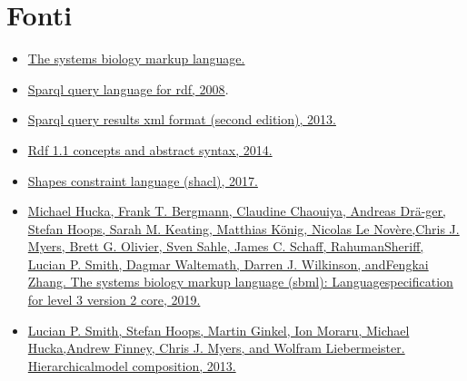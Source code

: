 \documentclass{article}
\begin{document}
\section{Fonti}
\begin{itemize}
    \item \href{http://sbml.org/Main_Page}{The systems biology markup language.}
    \item \href{https://www.w3.org/TR/rdf-sparql-query/}{Sparql query language for rdf, 2008}.  
    \item \href{https://www.w3.org/TR/rdf-sparql-XMLres/#defn-srd}{Sparql query results xml format (second edition), 2013.}
    \item \href{https://www.w3.org/TR/rdf11-concepts/#dfn-datatype}{Rdf 1.1 concepts and abstract syntax, 2014.}
    \item \href{https://www.w3.org/TR/shacl/}{Shapes constraint language (shacl), 2017.}
    \item \href{http://co.mbine.org/specifications/sbml.level-3.version-2.core.release-2.pdf}{Michael Hucka, Frank T. Bergmann, Claudine Chaouiya, Andreas Drä-ger, Stefan Hoops, Sarah M. Keating, Matthias König, Nicolas Le Novère,Chris J. Myers, Brett G. Olivier, Sven Sahle, James C. Schaff, RahumanSheriff, Lucian P. Smith, Dagmar Waltemath, Darren J. Wilkinson, andFengkai Zhang. The systems biology markup language (sbml): Languagespecification for level 3 version 2 core, 2019.} 
    \item \href{https://authors.library.caltech.edu/50975/1/sbml-comp-version-1-release-3.pdf}{Lucian P. Smith, Stefan Hoops, Martin Ginkel, Ion Moraru, Michael Hucka,Andrew Finney, Chris J. Myers, and Wolfram Liebermeister. Hierarchicalmodel composition, 2013.} 
\end{itemize}
\end{document}
